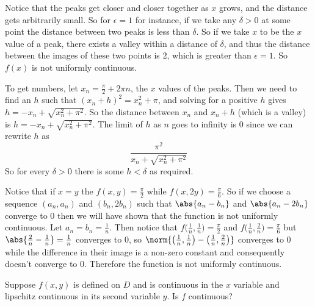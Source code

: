 \documentclass[10pt]{article}
\begin{document}
\begin{blankpp}

    \benum
        \item Notice that the peaks get closer and closer together as $x$ grows, and the distance gets arbitrarily small.
                So for $\epsilon=1$ for instance, if we take any $\delta>0$ at some point the distance between two peaks is less than $\delta$.
                So if we take $x$ to be the $x$ value of a peak, there exists a valley within a distance of $\delta$, and thus the distance between the images of these two points is $2$, which is greater
                than $\epsilon=1$.
                So $f(x)$ is not uniformly continuous.

                To get numbers, let $x_n=\frac\pi2+2\pi n$, the $x$ values of the peaks.
                Then we need to find an $h$ such that $(x_n+h)^2=x_n^2+\pi$, and solving for a positive $h$ gives $h=-x_n+\sqrt{x_n^2+\pi^2}$.
                So the distance between $x_n$ and $x_n+h$ (which is a valley) is $h=-x_n+\sqrt{x_n^2+\pi^2}$.
                The limit of $h$ as $n$ goes to infinity is $0$ since we can rewrite $h$ as
                \[ \frac{\pi^2}{x_n+\sqrt{x_n^2+\pi^2}} \]
                So for every $\delta>0$ there is some $h<\delta$ as required.
        \item Notice that if $x=y$ the $f(x,y)=\frac\pi2$ while $f(x,2y)=\frac\pi6$.
                So if we choose a sequence $(a_n,a_n)$ and $(b_n,2b_n)$ such that $\abs{a_n-b_n}$ and $\abs{a_n-2b_n}$ converge to $0$ then we will have shown that the function is not uniformly continuous.
                Let $a_n=b_n=\frac1n$.
                Then notice that $f\bigl(\frac1n,\frac1n\bigr)=\frac\pi2$ and $f\bigl(\frac1n,\frac2n\bigr)=\frac\pi6$ but $\abs{\frac2n-\frac1n}=\frac1n$ converges to $0$, so
                $\norm{\bigl(\frac1n,\frac1n\bigr)-\bigl(\frac1n,\frac2n\bigr)}$ converges to $0$ while the difference in their image is a non-zero constant and consequently doesn't converge to $0$.
                Therefore the function is not uniformly continuous.
    \eenum

\end{blankpp}

\begin{exercise*}

    Suppose $f(x,y)$ is defined on $D$ and is continuous in the $x$ variable and lipschitz continuous in its second variable $y$.
    Is $f$ continuous?

\end{exercise*}
\end{document}
